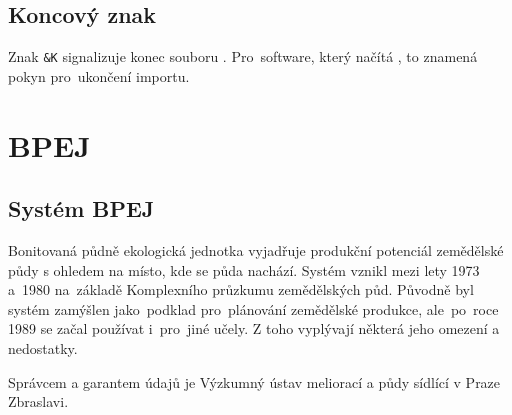 
\subsection{Koncový znak}
\label{koncovy_znak}

Znak \texttt{\&K} signalizuje konec souboru . Pro~software, který načítá , to znamená pokyn pro~ukončení importu.

\section{BPEJ}
\label{bpej}

\subsection{Systém BPEJ}
\label{system_bpej}

Bonitovaná půdně ekologická jednotka vyjadřuje produkční potenciál zemědělské půdy s ohledem na místo, kde se půda nachází. Systém  vznikl mezi lety 1973 a~1980 na~základě Komplexního průzkumu zemědělských půd. Původně byl systém  zamýšlen jako~podklad pro~plánování zemědělské produkce, ale~po~roce 1989 se začal používat i~pro~jiné učely. Z toho vyplývají některá jeho omezení a nedostatky.

Správcem a garantem údajů  je Výzkumný ústav meliorací a půdy sídlící v Praze Zbraslavi.

